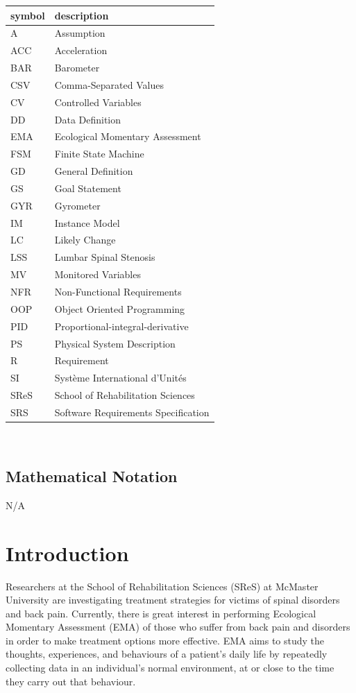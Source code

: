 \documentclass[12pt]{article}
\begin{document}
\renewcommand{\arraystretch}{1.2}

\begin{tabular}{l l} 
  \toprule		
  \textbf{symbol} & \textbf{description}\\
  \midrule 
  A & Assumption\\
  ACC & Acceleration\\
  BAR & Barometer\\
  CSV & Comma-Separated Values\\
  CV & Controlled Variables\\
  DD & Data Definition\\
  EMA & Ecological Momentary Assessment\\
  FSM & Finite State Machine\\
  GD & General Definition\\
  GS & Goal Statement\\
  GYR & Gyrometer\\
  IM & Instance Model\\
  LC & Likely Change\\
  LSS & Lumbar Spinal Stenosis\\
  MV & Monitored Variables\\
  NFR & Non-Functional Requirements\\
  OOP & Object Oriented Programming\\
  PID & Proportional-integral-derivative\\
  PS & Physical System Description\\
  R & Requirement\\
  SI & Syst\`{e}me International d'Unit\'{e}s\\
  SReS & School of Rehabilitation Sciences\\
  SRS & Software Requirements Specification\\
  \bottomrule
\end{tabular}\\

\subsection{Mathematical Notation}
N/A

\section{Introduction}

Researchers at the School of Rehabilitation Sciences (SReS) at McMaster University are investigating treatment strategies for victims of spinal disorders and back pain. Currently, there is great interest in performing Ecological Momentary Assessment (EMA) of those who suffer from back pain and disorders in order to make treatment options more effective. EMA aims to study the thoughts, experiences, and behaviours of a patient's daily life by repeatedly collecting data in an individual's normal environment, at or close to the time they carry out that behaviour.\\
\end{document}
